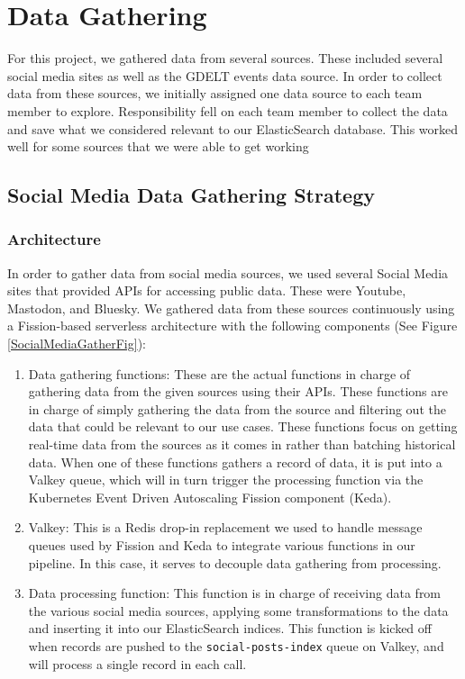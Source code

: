 \section{Data Gathering}\label{DataGathering}

For this project, we gathered data from several sources. These included several social media sites as well as the GDELT \cite{leetaru2013gdelt} events data source. In order to collect data from these sources, we initially assigned one data source to each team member to explore. Responsibility fell on each team member to collect the data and save what we considered relevant to our ElasticSearch database. This worked well for some sources that we were able to get working

\subsection{Social Media Data Gathering Strategy}

\subsubsection{Architecture}
In order to gather data from social media sources, we used several Social Media sites that provided APIs for accessing public data. These were Youtube, Mastodon, and Bluesky. We gathered data from these sources continuously using a Fission-based serverless architecture with the following components (See Figure \ref{SocialMediaGatherFig}):

\begin{enumerate}
	\item Data gathering functions: These are the actual functions in charge of gathering data from the given sources using their APIs. These functions are in charge of simply gathering the data from the source and filtering out the data that could be relevant to our use cases. These functions focus on getting real-time data from the sources as it comes in rather than batching historical data. When one of these functions gathers a record of data, it is put into a Valkey queue, which will in turn trigger the processing function via the Kubernetes Event Driven Autoscaling Fission component (Keda).
	
	\item Valkey: This is a Redis drop-in replacement we used to handle message queues used by Fission and Keda to integrate various functions in our pipeline. In this case, it serves to decouple data gathering from processing.
	
	\item Data processing function: This function is in charge of receiving data from the various social media sources, applying some transformations to the data and inserting it into our ElasticSearch indices. This function is kicked off when records are pushed to the \texttt{social-posts-index} queue on Valkey, and will process a single record in each call.
\end{enumerate}

